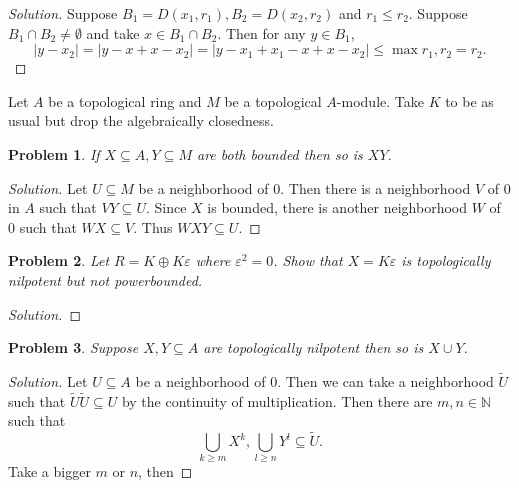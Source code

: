 \documentclass[8pt]{article}
\numberwithin{equation}{section}
\newenvironment{solution}{\begin{proof}[Solution]}{\end{proof}}
\newtheorem{problem}{Problem}[section]
\newcommand{\N}[0]{\mathbb{N}}
\newcommand{\ab}[1]{\vert #1 \vert}
\begin{document}
\begin{solution}
  Suppose $B_1 = D(x_1,r_1),B_2 = D(x_2,r_2)$ and $r_1\leq r_2$. Suppose $B_1\cap B_2\not=\emptyset$ and take $x\in B_1\cap B_2$. Then for any $y\in B_1$,
  \begin{equation*}
    \ab{y-x_2} = \ab{y-x+x-x_2} = \ab{y-x_1+x_1-x+x-x_2}\leq \max{r_1,r_2}=r_2.
  \end{equation*}
\end{solution}
Let $A$ be a topological ring and $M$ be a topological $A$-module. Take $K$ to be as usual but drop the algebraically closedness.
\begin{problem}
  If $X\subseteq A,Y\subseteq M$ are both bounded then so is $XY$.
\end{problem}
\begin{solution}
  Let $U\subseteq M$ be a neighborhood of $0$. Then there is a neighborhood $V$ of $0$ in $A$ such that $VY\subseteq U$. 
  Since $X$ is bounded, there is another neighborhood $W$ of $0$ such that $WX\subseteq V$. Thus $W XY\subseteq U$.
\end{solution}
\begin{problem}
  Let $R=K\oplus K\varepsilon$ where $\varepsilon^2=0$. Show that $X=K\varepsilon$ is topologically nilpotent but not powerbounded.
\end{problem}
\begin{solution}
  
\end{solution}
\begin{problem}
  Suppose $X,Y\subseteq A$ are topologically nilpotent then so is $X\cup Y$.
\end{problem}
\begin{solution}
  Let $U\subseteq A$ be a neighborhood of $0$. Then we can take a neighborhood $\tilde{U}$ such that $\tilde{U}\tilde{U}\subseteq U$ by the continuity of multiplication.
  Then there are $m,n\in\N$ such that 
  \begin{equation*}
    \bigcup_{k\geq m}X^k,\bigcup_{l\geq n}Y^l\subseteq \tilde{U}.
  \end{equation*}
  Take a bigger $m$ or $n$, then 
\end{solution}
\end{document}
